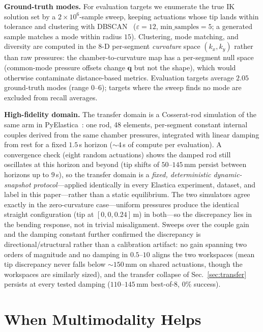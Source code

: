\textbf{Ground-truth modes.} For evaluation targets we enumerate the true IK
solution set by a $2\times10^6$-sample sweep, keeping actuations whose tip
lands within tolerance and clustering with DBSCAN~\cite{ester1996dbscan}
($\varepsilon{=}12$, $\text{min\_samples}{=}5$; a generated sample matches a
mode within radius $15$). Clustering, mode matching, and diversity are
computed in the 8-D per-segment \emph{curvature} space $(k_x,k_y)$ rather
than raw pressures: the chamber-to-curvature map has a per-segment null
space (common-mode pressure offsets change $\mathbf{q}$ but not the shape),
which would otherwise contaminate distance-based metrics. Evaluation targets
average $2.05$ ground-truth modes (range 0--6); targets where the sweep
finds no mode are excluded from recall averages.

\textbf{High-fidelity domain.} The transfer domain is a Cosserat-rod
simulation of the same arm in PyElastica~\cite{gazzola2018forward,
zhang2019modeling}: one rod, 48 elements, per-segment constant internal
couples derived from the same chamber pressures, integrated with linear
damping from rest for a fixed $1.5\,$s horizon (${\sim}4\,$s of compute per
evaluation). A convergence check (eight random actuations) shows the
damped rod still oscillates at
this horizon and beyond (tip shifts of $50$--$145\,$mm persist between
horizons up to $9\,$s), so the transfer domain is a \emph{fixed,
deterministic dynamic-snapshot protocol}---applied identically in every
Elastica experiment, dataset, and label in this paper---rather than a
static equilibrium. The two simulators
agree exactly in the zero-curvature case---uniform pressures produce the
identical straight configuration (tip at $[0,0,0.24]\,$m) in both---so the
discrepancy lies in the bending response, not in trivial misalignment.
Sweeps over the couple gain and the damping constant further confirmed the
discrepancy is directional/structural rather than a calibration artifact:
no gain spanning two orders of magnitude and no damping in $0.5$--$10$
aligns the two workspaces (mean tip discrepancy never falls below
${\sim}150\,$mm on shared actuations, though the workspaces are similarly
sized), and the transfer collapse of Sec.~\ref{sec:transfer} persists at
every tested damping ($110$--$145\,$mm best-of-8, $0\%$ success).

\section{When Multimodality Helps}
\label{sec:core}

